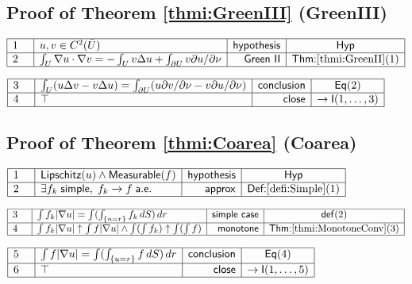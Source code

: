 \documentclass[11pt,reqno]{amsart}
\begin{document}
	\subsection*{Proof of Theorem \protect\ref{thmi:GreenIII} (\textsf{GreenIII})}
	\noindent$\begin{array}{|m{0.5cm}|l|r|c|}
	\hline
	1 & u,v\in C^{2}(\bar{U}) & \mathsf{hypothesis} & \mathsf{Hyp} \\ \hline
	2 & \int_{U}\nabla u\cdot\nabla v=-\int_{U}v\Delta u+\int_{\partial U}v\partial u/\partial\nu & \mathsf{Green\ II} & \textsf{Thm:}\ref{thmi:GreenII}(1) \\ \hline
	\end{array}$
	\par\nointerlineskip\noindent$\begin{array}{|m{0.5cm}|l|r|c|}
	\hline
	3 & \int_{U}(u\Delta v-v\Delta u)=\int_{\partial U}(u\partial v/\partial\nu-v\partial u/\partial\nu) & \mathsf{conclusion} & \mathsf{Eq}(2) \\ \hline
	4 & \top & \mathsf{close} & \to\mathsf{I}(1,\dots,3) \\ \hline
	\end{array}$
	\medskip
	
	\subsection*{Proof of Theorem \protect\ref{thmi:Coarea} (\textsf{Coarea})}
	\noindent$\begin{array}{|m{0.5cm}|l|r|c|}
	\hline
	1 & \mathsf{Lipschitz}(u)\wedge\mathsf{Measurable}(f) & \mathsf{hypothesis} & \mathsf{Hyp} \\ \hline
	2 & \exists f_{k}\;\mathsf{simple},\;f_{k}\to f\;\mathsf{a.e.} & \mathsf{approx} & \textsf{Def:}\ref{defi:Simple}(1) \\ \hline
	\end{array}$
	\par\nointerlineskip\noindent$\begin{array}{|m{0.5cm}|l|r|c|}
	\hline
	3 & \int f_{k}|\nabla u|=\int(\int_{\{u=r\}}f_{k}\,dS)\,dr & \mathsf{simple\ case} & \mathsf{def}(2) \\ \hline
	4 & \int f_{k}|\nabla u|\uparrow\int f|\nabla u|\wedge\int(\int f_{k})\uparrow\int(\int f) & \mathsf{monotone} & \textsf{Thm:}\ref{thmi:MonotoneConv}(3) \\ \hline
	\end{array}$
	\par\nointerlineskip\noindent$\begin{array}{|m{0.5cm}|l|r|c|}
	\hline
	5 & \int f|\nabla u|=\int(\int_{\{u=r\}}f\,dS)\,dr & \mathsf{conclusion} & \mathsf{Eq}(4) \\ \hline
	6 & \top & \mathsf{close} & \to\mathsf{I}(1,\dots,5) \\ \hline
	\end{array}$
	\medskip
	
\end{document}
